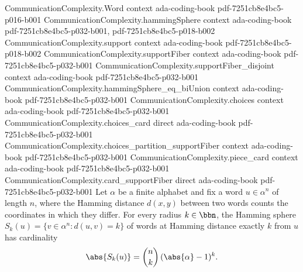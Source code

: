 \begin{lemma}
\label{CommunicationComplexity.hammingSphere_card}
\leanok
{}
\proofstep
  {CommunicationComplexity.Word}
  {context}
  {ada-coding-book}
  {pdf-7251cb8e4bc5-p016-b001}
\proofstep
  {CommunicationComplexity.hammingSphere}
  {context}
  {ada-coding-book}
  {pdf-7251cb8e4bc5-p032-b001,
    pdf-7251cb8e4bc5-p018-b002}
\proofstep
  {CommunicationComplexity.support}
  {context}
  {ada-coding-book}
  {pdf-7251cb8e4bc5-p018-b002}
\proofstep
  {CommunicationComplexity.supportFiber}
  {context}
  {ada-coding-book}
  {pdf-7251cb8e4bc5-p032-b001}
\proofstep
  {CommunicationComplexity.supportFiber_disjoint}
  {context}
  {ada-coding-book}
  {pdf-7251cb8e4bc5-p032-b001}
\proofstep
  {CommunicationComplexity.hammingSphere_eq_biUnion}
  {context}
  {ada-coding-book}
  {pdf-7251cb8e4bc5-p032-b001}
\proofstep
  {CommunicationComplexity.choices}
  {context}
  {ada-coding-book}
  {pdf-7251cb8e4bc5-p032-b001}
\proofstep
  {CommunicationComplexity.choices_card}
  {direct}
  {ada-coding-book}
  {pdf-7251cb8e4bc5-p032-b001}
\proofstep
  {CommunicationComplexity.choices_partition_supportFiber}
  {context}
  {ada-coding-book}
  {pdf-7251cb8e4bc5-p032-b001}
\proofstep
  {CommunicationComplexity.piece_card}
  {context}
  {ada-coding-book}
  {pdf-7251cb8e4bc5-p032-b001}
\proofstep
  {CommunicationComplexity.card_supportFiber}
  {direct}
  {ada-coding-book}
  {pdf-7251cb8e4bc5-p032-b001}
Let $\alpha$ be a finite alphabet and fix a word $u \in \alpha^n$ of length $n$, where
the Hamming distance $d(x,y)$ between two words counts the coordinates in which they
differ. For every radius $k \in \bbn$, the Hamming sphere $S_k(u) = \{v \in \alpha^n :
d(u,v) = k\}$ of words at Hamming distance exactly $k$ from $u$ has cardinality
\[
  \abs{S_k(u)} = \binom{n}{k}\,(\abs{\alpha}-1)^k.
\]
\end{lemma}

